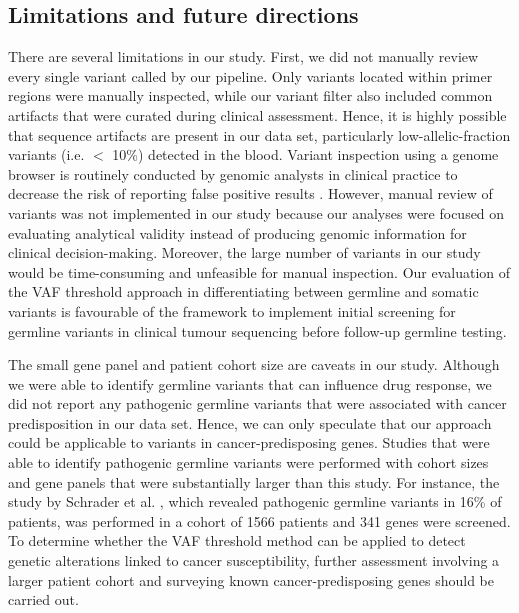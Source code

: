 \subsection{Limitations and future directions}

There are several limitations in our study. First, we did not manually review every single variant called by our pipeline. Only variants located within primer regions were manually inspected, while our variant filter also included common artifacts that were curated during clinical assessment. Hence, it is highly possible that sequence artifacts are present in our data set, particularly low-allelic-fraction variants (i.e. $<$ 10\%) detected in the blood. Variant inspection using a genome browser is routinely conducted by genomic analysts in clinical practice to decrease the risk of reporting false positive results \cite{Strom2016, Garofalo2016}. However, manual review of variants was not implemented in our study because our analyses were focused on evaluating analytical validity instead of producing genomic information for clinical decision-making. Moreover, the large number of variants in our study would be time-consuming and unfeasible for manual inspection. Our evaluation of the VAF threshold approach in differentiating between germline and somatic variants is favourable of the framework to implement initial screening for germline variants in clinical tumour sequencing before follow-up germline testing.

The small gene panel and patient cohort size are caveats in our study. Although we were able to identify germline variants that can influence drug response, we did not report any pathogenic germline variants that were associated with cancer predisposition in our data set. Hence, we can only speculate that our approach could be applicable to variants in cancer-predisposing genes. Studies that were able to identify pathogenic germline variants were performed with cohort sizes and gene panels that were substantially larger than this study. For instance, the study by Schrader et al. \cite{Schrader2015}, which revealed pathogenic germline variants in 16\% of patients, was performed in a cohort of 1566 patients and 341 genes were screened. To determine whether the VAF threshold method can be applied to detect genetic alterations linked to cancer susceptibility, further assessment involving a larger patient cohort and surveying known cancer-predisposing genes should be carried out.

